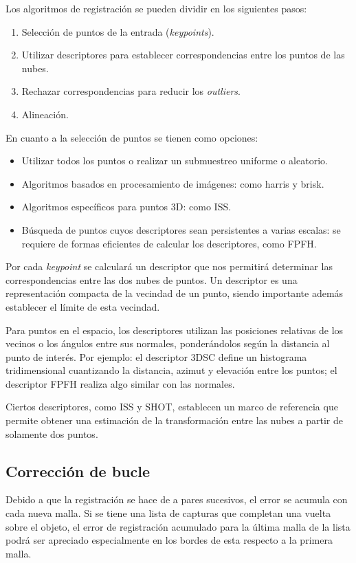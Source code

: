 		Los algoritmos de registración se pueden dividir en los siguientes pasos:
		\begin{enumerate}
			\item Selección de puntos de la entrada (\emph{keypoints}).
			\item Utilizar descriptores para establecer correspondencias entre los puntos de las nubes.
			\item Rechazar correspondencias para reducir los \emph{outliers}.
			\item Alineación.\cite{conf/3dim/RusinkiewiczL01}
		\end{enumerate}

		En cuanto a la selección de puntos se tienen como opciones:
		\begin{itemize}
			\item Utilizar todos los puntos o realizar un submuestreo uniforme o aleatorio.
			\item Algoritmos basados en procesamiento de imágenes: como harris\cite{Harris88acombined} y brisk\cite{Leutenegger:2011:BBR:2355573.2356277}.
			\item Algoritmos específicos para puntos 3D: como ISS\cite{ISS}.
			\item Búsqueda de puntos cuyos descriptores sean persistentes a varias escalas: se requiere de formas eficientes de calcular los descriptores, como FPFH\cite{Rusu:2009:FPF:1703435.1703733}.
		\end{itemize}

			Por cada \emph{keypoint} se calculará un descriptor que nos
			permitirá determinar las correspondencias entre las dos nubes de
			puntos.
			Un descriptor es una representación compacta
			de la vecindad de un punto,
			siendo importante además establecer el límite de esta vecindad.

			Para puntos en el espacio, los descriptores utilizan las
			posiciones relativas de los vecinos o los ángulos entre sus
			normales, ponderándolos según la distancia al punto de interés.
			Por ejemplo: el descriptor 3DSC define un histograma tridimensional
			cuantizando la distancia, azimut y elevación entre los puntos;
			el descriptor FPFH realiza algo similar con las normales.

			Ciertos descriptores, como ISS y SHOT, establecen un marco de
			referencia que permite obtener una estimación de la transformación
			entre las nubes a partir de solamente dos puntos.

		\subsection{Corrección de bucle}
			Debido a que la registración se hace de a pares sucesivos, el error
			se acumula con cada nueva malla.  Si se tiene una lista de capturas
			que completan una vuelta sobre el objeto, el error de registración
			acumulado para la última malla de la lista podrá ser apreciado
			especialmente en los bordes de esta respecto a la primera malla.

